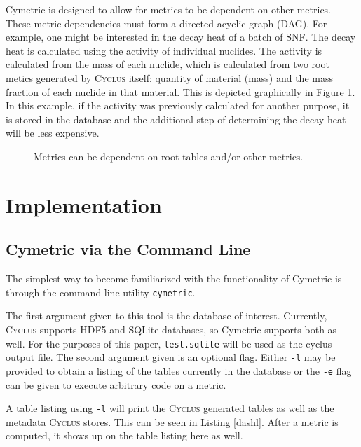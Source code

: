 \documentclass{anstrans}
\newcommand{\cyclus}{\textsc{Cyclus}\xspace}
\newcommand{\code}[1]{{\color{code}\texttt{#1}}}
\begin{document}
Cymetric is designed to allow for metrics to be dependent on other 
metrics. These metric dependencies must form a directed acyclic graph (DAG).
For example, one might be interested in the decay heat of a batch of 
\gls{SNF}. The decay heat is calculated using the activity of individual 
nuclides. The activity is calculated from the mass of each nuclide, which 
is calculated from two root metics generated by  \cyclus itself: quantity of 
material (mass) and the mass fraction of each nuclide in that material. 
This is depicted graphically in Figure \ref{fig:metdeps}. In this example, if the activity was previously calculated for another 
purpose, it is stored in the database and the additional step of 
determining the decay heat will be less expensive. 

\begin{figure}[htbp!]
\begin{center}
\end{center}
\caption{Metrics can be dependent on root tables and/or other metrics.}
\label{fig:metdeps}
\end{figure}

\section{Implementation}

\subsection{Cymetric via the Command Line}
The simplest way to become familiarized with the functionality of Cymetric 
is through the command line utility \code{cymetric}. 

The first argument given to this tool is the database of interest. 
Currently, \cyclus supports \gls{HDF5} \cite{folk2011overview} and \gls{SQLite} \cite{owens2006definitive} databases, 
so Cymetric supports both as well. For the purposes of this paper, 
\code{test.sqlite} will be used as the cyclus output file. The second 
argument given is an optional flag. Either \code{-l} may be provided to obtain 
a listing of the tables currently in the database or the \code{-e} flag 
can be given to execute arbitrary code on a metric. 

A table listing using \code{-l} will print the \cyclus generated tables 
as well as the metadata \cyclus stores. This can be seen in Listing 
\ref{dashl}. After a metric is computed, it shows up on the table 
listing here as well. 
\end{document}
